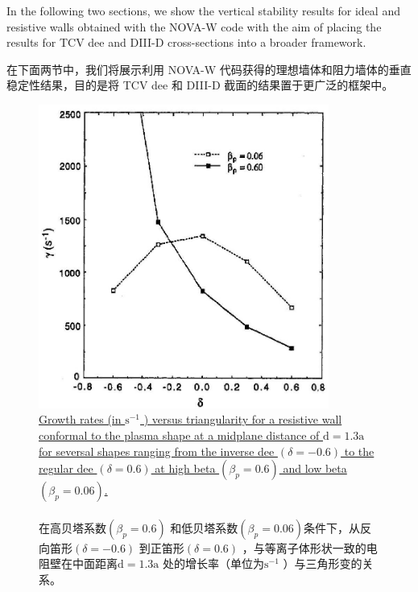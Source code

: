 \documentclass[utf8]{ctexart}
\newcommand\enzhbox[2]{
  	\quad\par \begin{paracol}{2} \colseprulecolor{black} 
  		\begin{spacing}{1.0}
  			\footnotesize  #1
  		\end{spacing}
  		\switchcolumn[1] 
  		#2
  	\end{paracol} \quad\par
  }
\begin{document}
\begin{sloppypar}
 
\enzhbox{  In the following two sections, we show the vertical stability results for ideal and resistive walls obtained with the NOVA-W code with the aim of placing the results for TCV dee and DIII-D cross-sections into a broader framework.}{
在下面两节中，我们将展示利用 NOVA-W 代码获得的理想墙体和阻力墙体的垂直稳定性结果，目的是将 TCV dee 和 DIII-D 截面的结果置于更广泛的框架中。}
  \begin{figure}[H]
  	\centering
  	\includegraphics[max width=0.85\textwidth,max height=0.3\textheight]{2025_01_10_a0135324997886412d98g-6}
 \caption{\uline{Growth rates (in $\mathrm{s}^{-1}$ ) versus triangularity for a resistive wall conformal to the plasma shape at a midplane distance of $\mathrm{d}=1.3 \mathrm{a}$ for seversal shapes ranging from the inverse dee $(\delta=-0.6)$ to the regular dee $(\delta=0.6)$ at high beta $\left(\beta_{p}=0.6\right)$ and low beta $\left(\beta_{p}=0.06\right)$.\\}\\在高贝塔系数$\left(\beta_{p}=0.6\right)$ 和低贝塔系数$\left(\beta_{p}=0.06\right)$条件下，从反向笛形$(\delta=-0.6)$ 到正笛形$(\delta=0.6)$ ，与等离子体形状一致的电阻壁在中面距离$\mathrm{d}=1.3 \mathrm{a}$ 处的增长率（单位为$\mathrm{s}^{-1}$ ）与三角形变的关系。}
  	\label{fig4.}
  \end{figure}
  

\end{sloppypar}
\end{document}
